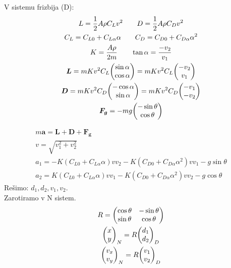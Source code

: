 \documentclass[11pt,a4paper]{article}
\begin{document}
V sistemu frizbija (D):
\begin{gather}
L = \dfrac{1}{2} A \rho C_L v^2 \qquad D = \dfrac{1}{2} A \rho C_D v^2\\
C_L = C_{L0} + C_{L \alpha} \alpha \qquad C_D = C_{D0} + C_{D \alpha} \alpha^2\\
K = \dfrac{A \rho}{2 m} \qquad \tan \alpha = \dfrac{-v_2}{v_1}\\
\bm L = m K v^2 C_L \mqty(\sin \alpha \\ \cos \alpha) = m K v^2 C_L \mqty(-v_2 \\ v_1\\)\\
\bm D = m K v^2 C_D \mqty(-\cos \alpha \\ \sin \alpha) = m K v^2 C_D \mqty(-v_1 \\ -v_2\\)\\
\bm F_{\bm g} = - m g  \mqty(-\sin \theta \\ \cos \theta)\\
\end{gather}

\begin{gather}
m \bm a = \bm L + \bm D + \bm F_{\bm g}\\
v = \sqrt{v_1^2 + v_2^2}\\
a_1 = -K (C_{L0} + C_{L \alpha} \alpha) v v_2 - K (C_{D0} + C_{D \alpha} \alpha^2) v v_1 - g \sin \theta\\
a_2 = K (C_{L0} + C_{L \alpha} \alpha) v v_1 - K (C_{D0} + C_{D \alpha} \alpha^2) v v_2 - g \cos\theta
\end{gather}
Rešimo: \(d_1, d_2, v_1, v_2 \).\\
Zarotiramo v N sistem.
\begin{gather}
R = \mqty(\cos \theta & -\sin \theta \\ \sin \theta & \cos \theta)\\
\mqty(x \\ y)_N = R \mqty(d_1 \\ d_2)_D\\
\mqty(v_x \\ v_y)_N = R \mqty(v_1 \\ v_2)_D
\end{gather}
\end{document}
